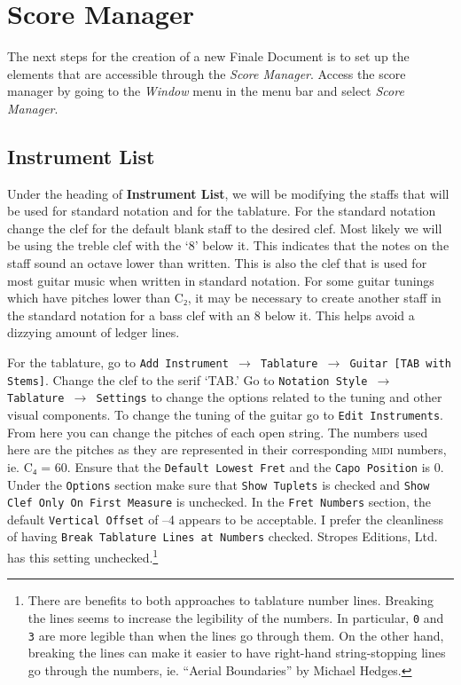 \documentclass[]{memoir}
\begin{document}
\section{Score Manager}
\label{sec:score-manager}

The next steps for the creation of a new Finale Document is to set up the elements that are accessible through the \textit{Score Manager}. Access the score manager by going to the \textit{Window} menu in the menu bar and select \textit{Score Manager}.

\subsection{Instrument List}
\label{sec:instrument-list}

Under the heading of \textbf{Instrument List}, we will be modifying the staffs that will be used for standard notation and for the tablature. For the standard notation change the clef for the default blank staff to the desired clef. Most likely we will be using the treble clef with the `8' below it. This indicates that the notes on the staff sound an octave lower than written. This is also the clef that is used for most guitar music when written in standard notation. For some guitar tunings which have pitches lower than C₂, it may be necessary to create another staff in the standard notation for a bass clef with an 8 below it. This helps avoid a dizzying amount of ledger lines.

For the tablature, go to \texttt{Add Instrument $\rightarrow$ Tablature $\rightarrow$ Guitar [TAB with Stems]}. Change the clef to the serif `TAB.' Go to \texttt{Notation Style $\rightarrow$ Tablature $\rightarrow$ Settings} to change the options related to the tuning and other visual components. To change the tuning of the guitar go to \texttt{Edit Instruments}. From here you can change the pitches of each open string. The numbers used here are the pitches as they are represented in their corresponding \textsc{midi} numbers, ie. C₄ = 60. Ensure that the \texttt{Default Lowest Fret} and the \texttt{Capo Position} is 0. Under the \texttt{Options} section make sure that \texttt{Show Tuplets} is checked and \texttt{Show Clef Only On First Measure} is unchecked. In the \texttt{Fret Numbers} section, the default \texttt{Vertical Offset}  of --4 appears to be acceptable. I prefer the cleanliness of having \texttt{Break Tablature Lines at Numbers} checked. Stropes Editions, Ltd. has this setting unchecked.\footnote{There are benefits to both approaches to tablature number lines. Breaking the lines seems to increase the legibility of the numbers. In particular, \texttt{0} and \texttt{3} are more legible than when the lines go through them. On the other hand, breaking the lines can make it easier to have right-hand string-stopping lines go through the numbers, ie. ``Aerial Boundaries'' by Michael Hedges.}
\end{document}
